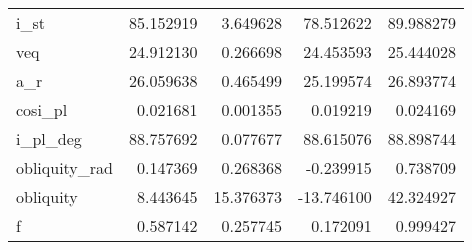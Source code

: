 \begin{tabular}{lrrrr}
i\_st          &  85.152919 &   3.649628 &  78.512622 &   89.988279 \\
veq           &  24.912130 &   0.266698 &  24.453593 &   25.444028 \\
a\_r           &  26.059638 &   0.465499 &  25.199574 &   26.893774 \\
cosi\_pl       &   0.021681 &   0.001355 &   0.019219 &    0.024169 \\
i\_pl\_deg      &  88.757692 &   0.077677 &  88.615076 &   88.898744 \\
obliquity\_rad &   0.147369 &   0.268368 &  -0.239915 &    0.738709 \\
obliquity     &   8.443645 &  15.376373 & -13.746100 &   42.324927 \\
f             &   0.587142 &   0.257745 &   0.172091 &    0.999427 \\
\bottomrule
\end{tabular}
